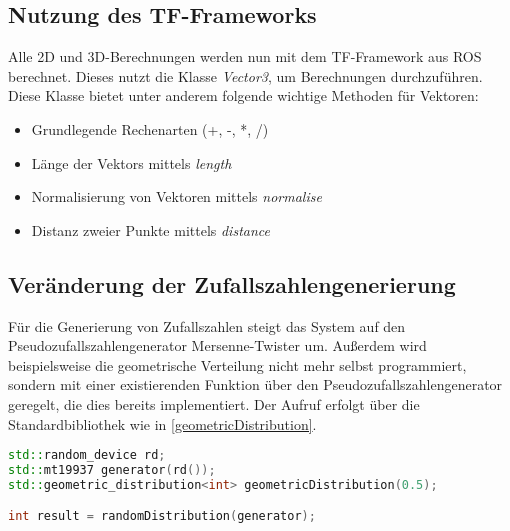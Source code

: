 
\subsection{Nutzung des TF-Frameworks}

Alle 2D und 3D-Berechnungen werden nun mit dem TF-Framework aus \ac{ROS} berechnet. Dieses nutzt die Klasse \emph{Vector3}, um Berechnungen durchzuführen. Diese Klasse bietet unter anderem folgende wichtige Methoden für Vektoren:
\begin{itemize}
  \item Grundlegende Rechenarten (+, -, *, /)
  \item Länge der Vektors mittels \emph{length}
  \item Normalisierung von Vektoren mittels \emph{normalise}
  \item Distanz zweier Punkte mittels \emph{distance}
\end{itemize}

\subsection{Veränderung der Zufallszahlengenerierung}

Für die Generierung von Zufallszahlen steigt das System auf den Pseudozufallszahlengenerator Mersenne-Twister \autocite{matsumoto1998mersenne} um. Außerdem wird beispielsweise die geometrische Verteilung nicht mehr selbst programmiert, sondern mit einer existierenden Funktion über den Pseudozufallszahlengenerator geregelt, die dies bereits implementiert. Der Aufruf erfolgt über die Standardbibliothek wie in \autoref{geometricDistribution}.

\begin{lstlisting}[label={geometricDistribution}, language=C++, caption={Geometrische Verteilung mittels C++}]
std::random_device rd;
std::mt19937 generator(rd());
std::geometric_distribution<int> geometricDistribution(0.5);

int result = randomDistribution(generator);
\end{lstlisting}